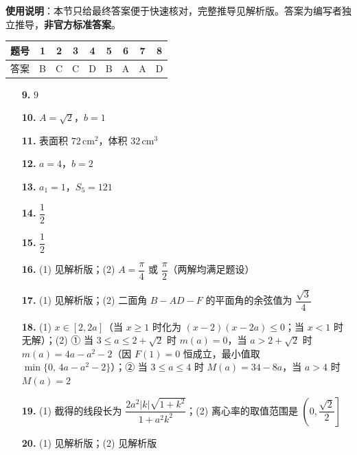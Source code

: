 
\begin{gknotice}
\textbf{使用说明}：本节只给最终答案便于快速核对，完整推导见解析版。答案为编写者独立推导，\textbf{非官方标准答案}。
\end{gknotice}

\begin{center}\begin{tabular}{ccccccccc}
\toprule
题号 & 1 & 2 & 3 & 4 & 5 & 6 & 7 & 8 \\
\midrule
答案 & B & C & C & D & B & A & A & D \\
\bottomrule
\end{tabular}\end{center}

\begin{itemize}[leftmargin=2.6em]
  \item[\textbf{9.}] \(9\)
  \item[\textbf{10.}] \(A=\sqrt{2}\)，\(b=1\)
  \item[\textbf{11.}] 表面积 \(72\,\mathrm{cm}^{2}\)，体积 \(32\,\mathrm{cm}^{3}\)
  \item[\textbf{12.}] \(a=4\)，\(b=2\)
  \item[\textbf{13.}] \(a_{1}=1\)，\(S_{5}=121\)
  \item[\textbf{14.}] \(\dfrac{1}{2}\)
  \item[\textbf{15.}] \(\dfrac{1}{2}\)
\end{itemize}

\begin{itemize}[leftmargin=2.6em]
  \item[\textbf{16.}] (1) 见解析版；(2) \(A=\dfrac{\pi}{4}\) 或 \(\dfrac{\pi}{2}\)（两解均满足题设）
  \item[\textbf{17.}] (1) 见解析版；(2) 二面角 \(B-AD-F\) 的平面角的余弦值为 \(\dfrac{\sqrt{3}}{4}\)
  \item[\textbf{18.}] (1) \(x\in[2,2a]\)（当 \(x\geqslant 1\) 时化为 \((x-2)(x-2a)\leqslant 0\)；当 \(x<1\) 时无解）；(2) ① 当 \(3\leqslant a\leqslant 2+\sqrt{2}\) 时 \(m(a)=0\)，当 \(a>2+\sqrt{2}\) 时 \(m(a)=4a-a^{2}-2\)（因 \(F(1)=0\) 恒成立，最小值取 \(\min\{0,\,4a-a^{2}-2\}\)）；② 当 \(3\leqslant a\leqslant 4\) 时 \(M(a)=34-8a\)，当 \(a>4\) 时 \(M(a)=2\)
  \item[\textbf{19.}] (1) 截得的线段长为 \(\dfrac{2a^{2}|k|\sqrt{1+k^{2}}}{1+a^{2}k^{2}}\)；(2) 离心率的取值范围是 \(\left(0,\dfrac{\sqrt{2}}{2}\right]\)
  \item[\textbf{20.}] (1) 见解析版；(2) 见解析版
\end{itemize}
